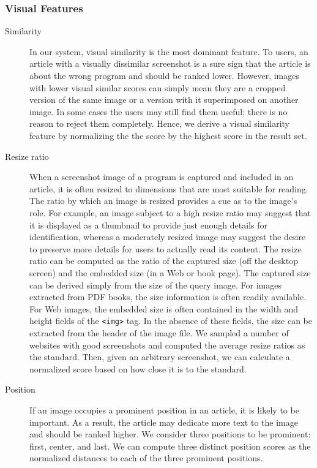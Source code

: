 \documentclass{www2010-submission}
\begin{document}
\subsubsection{Visual Features}

\begin{description}

\item[Similarity] In our system, visual similarity is the most
  dominant feature. To users, an article with a visually dissimilar
  screenshot is a sure sign that the article is about the wrong
  program and should be ranked lower. However, images with lower
  visual similar scores can simply mean they are a cropped version of
  the same image or a version with it superimposed on another
  image. In some cases the users may still find them useful; there is
  no reason to reject them completely. Hence, we derive a visual
  similarity feature by normalizing the the score by the highest score
  in the result set.

\item[Resize ratio] When a screenshot image of a program is captured
  and included in an article, it is often resized to dimensions that
  are most suitable for reading. The ratio by which an image is
  resized provides a cue as to the image's role. For example, an image
  subject to a high resize ratio may suggest that it is displayed as a
  thumbnail to provide just enough details for identification, whereas
  a moderately resized image may suggest the desire to preserve more
  details for users to actually read its content. The resize ratio
  can be computed as the ratio of the captured size (off the desktop
  screen) and the embedded size (in a Web or book page). The captured
  size can be derived simply from the size of the query image. For
  images extracted from PDF books, the size information is often
  readily available. For Web images, the embedded size is often
  contained in the width and height fields of the \texttt{<img>} tag. In the
  absence of these fields, the size can be extracted from the header
  of the image file. We sampled a number of websites with good
  screenshots and computed the average resize ratios as the standard.
  Then, given an arbitrary screenshot, we can calculate a normalized
  score based on how close it is to the standard.

\item[Position] If an image occupies a prominent position in an
  article, it is likely to be important. As a result, the article may
  dedicate more text to the image and should be ranked higher.  We
  consider three positions to be prominent: first, center, and
  last. We can compute three distinct position scores as the
  normalized distances to each of the three prominent positions.


\end{description}
\end{document}
